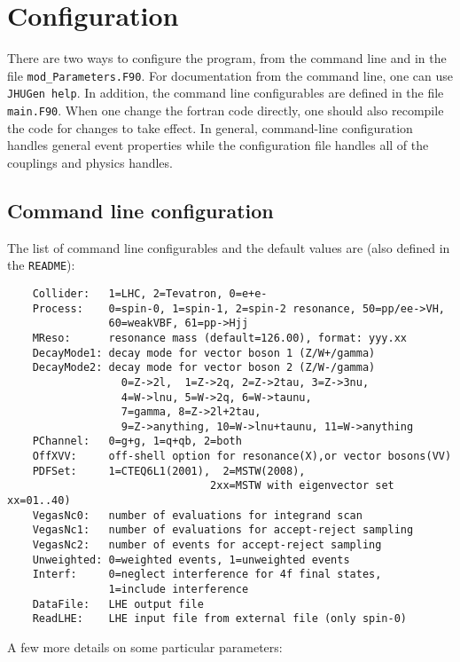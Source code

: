 \documentclass[aps,superscriptaddress,nofootinbib]{revtex4}
\begin{document}
\section{ Configuration }

There are two ways to configure the program, from the command line and in the file \verb|mod_Parameters.F90|.  For documentation from the command line, one can use \verb|JHUGen help|.  In addition, the command line configurables are defined in the file \verb|main.F90|.  When one change the fortran code directly, one should also recompile the code for changes to take effect.  In general, command-line configuration handles general event properties while the configuration file handles all of the couplings and physics handles.

\subsection{ Command line configuration }

The list of command line configurables and the default values are (also defined in the \verb|README|):

\begin{verbatim}
    Collider:   1=LHC, 2=Tevatron, 0=e+e-
    Process:    0=spin-0, 1=spin-1, 2=spin-2 resonance, 50=pp/ee->VH,
                60=weakVBF, 61=pp->Hjj
    MReso:      resonance mass (default=126.00), format: yyy.xx
    DecayMode1: decay mode for vector boson 1 (Z/W+/gamma)
    DecayMode2: decay mode for vector boson 2 (Z/W-/gamma)
                  0=Z->2l,  1=Z->2q, 2=Z->2tau, 3=Z->3nu,
                  4=W->lnu, 5=W->2q, 6=W->taunu,
                  7=gamma, 8=Z->2l+2tau,
                  9=Z->anything, 10=W->lnu+taunu, 11=W->anything
    PChannel:   0=g+g, 1=q+qb, 2=both
    OffXVV:     off-shell option for resonance(X),or vector bosons(VV)
    PDFSet:     1=CTEQ6L1(2001),  2=MSTW(2008),  
                                2xx=MSTW with eigenvector set xx=01..40)
    VegasNc0:   number of evaluations for integrand scan
    VegasNc1:   number of evaluations for accept-reject sampling
    VegasNc2:   number of events for accept-reject sampling
    Unweighted: 0=weighted events, 1=unweighted events
    Interf:     0=neglect interference for 4f final states, 
                1=include interference
    DataFile:   LHE output file
    ReadLHE:    LHE input file from external file (only spin-0)
\end{verbatim}   
   
\noindent
A few more details on some particular parameters:
\end{document}
